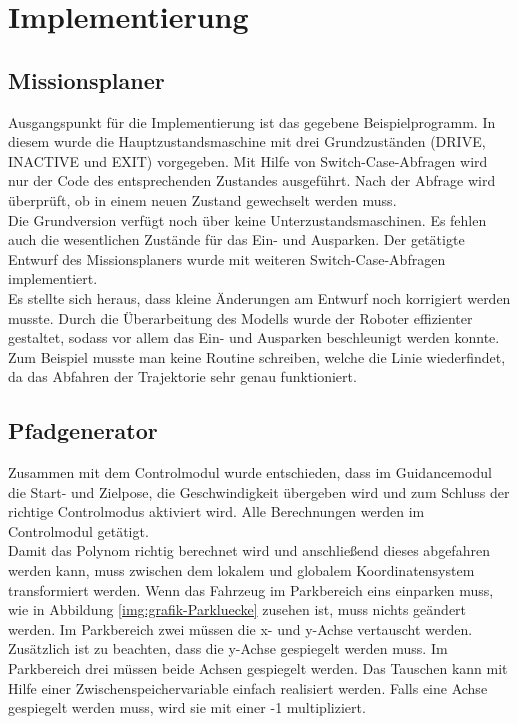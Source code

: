 \chapter{Implementierung}

\section{Missionsplaner}
Ausgangspunkt für die Implementierung ist das gegebene Beispielprogramm. In diesem wurde die Hauptzustandsmaschine mit drei Grundzuständen (DRIVE, INACTIVE und EXIT) vorgegeben. Mit Hilfe von Switch-Case-Abfragen wird nur der Code des entsprechenden Zustandes ausgeführt. Nach der Abfrage wird überprüft, ob in einem neuen Zustand gewechselt werden muss.\\


\noindent Die Grundversion verfügt noch über keine Unterzustandsmaschinen. Es fehlen auch die wesentlichen Zustände für das Ein- und Ausparken. Der getätigte Entwurf des Missionsplaners wurde mit weiteren Switch-Case-Abfragen implementiert. \\

\noindent Es stellte sich heraus, dass kleine Änderungen am Entwurf noch korrigiert werden musste. Durch die Überarbeitung des Modells wurde der Roboter effizienter gestaltet, sodass vor allem das Ein- und Ausparken beschleunigt werden konnte. Zum Beispiel musste man keine Routine schreiben, welche die Linie wiederfindet, da das Abfahren der Trajektorie sehr genau funktioniert.

\section{Pfadgenerator}

Zusammen mit dem Controlmodul wurde entschieden, dass im Guidancemodul die Start- und Zielpose, die Geschwindigkeit übergeben wird und zum Schluss der richtige Controlmodus aktiviert wird. Alle Berechnungen werden im Controlmodul getätigt.\\


\noindent Damit das Polynom richtig berechnet wird und anschließend dieses abgefahren werden kann, muss zwischen dem lokalem und globalem Koordinatensystem transformiert werden. Wenn das Fahrzeug im Parkbereich eins einparken muss, wie in Abbildung \ref{img:grafik-Parkluecke} zusehen ist, muss nichts geändert werden. 
Im Parkbereich zwei müssen die x- und y-Achse vertauscht werden. Zusätzlich ist zu beachten, dass die y-Achse gespiegelt werden muss. Im Parkbereich drei müssen beide Achsen gespiegelt werden. Das Tauschen kann mit Hilfe einer Zwischenspeichervariable einfach realisiert werden. Falls eine Achse gespiegelt werden muss, wird sie mit einer -1 multipliziert.